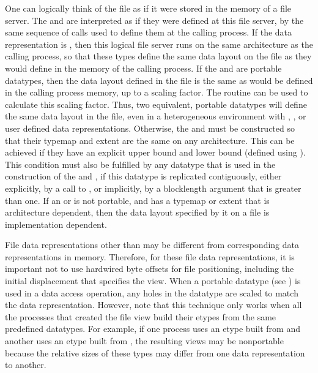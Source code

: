 \begin{users}
One can logically think of the file as if it were stored in the memory of a
file server.  The  and  are interpreted
as if they were defined at this file server, by the same sequence of
calls used to define them at the calling process.  If the data
representation is , then this logical file server runs on the
same architecture as the calling process, so that these types define
the same data layout on the file as they would define in the memory of
the calling process.  If the  and  are
portable datatypes, then the data layout defined in the file is the
same as would be defined in the calling process memory, up to a scaling
factor.  The routine 
can be used to
calculate this scaling factor.  Thus, two equivalent, portable
datatypes will define the same data layout in the file, even in a
heterogeneous environment with ,
,
or user
defined data representations.  Otherwise, the  and
 must be constructed so that their typemap and extent
are the same on any architecture.  This can be achieved if they
have an explicit upper bound and lower bound
(defined using
).  This condition must also be
fulfilled by any datatype that is used in the construction of the
 and , if this datatype is replicated
contiguously, either explicitly, by a call to
, or implicitly, by a blocklength argument
that is greater than one.  If an  or  is
not portable, and has a typemap or extent that is architecture
dependent, then the data layout specified by it on a file is
implementation dependent.

File data representations other than  may
be different from corresponding data representations in
memory.  Therefore, for these file data representations,
it is important not to use hardwired byte offsets for
file positioning, including the initial displacement that
specifies the view.
When a portable datatype
(see )
is used in a data access operation, 
any holes in the datatype are scaled to match the data representation.
However,
note that this technique only works when all the processes
that created the file view build their etypes from the same
predefined datatypes.
For example, if one
process
uses an etype built from 
and another uses an etype built from ,
the resulting views
may
be nonportable because the relative
sizes of these types may differ from one data representation to another.
\end{users}

